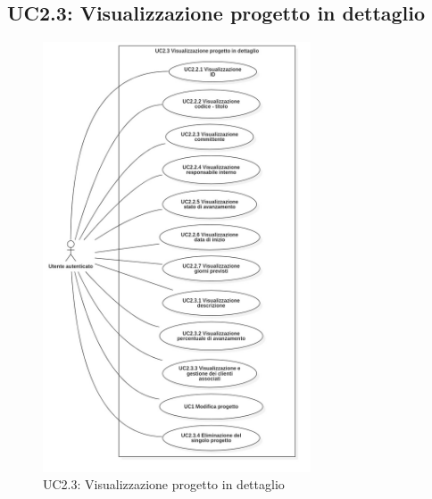 \pagebreak

\subsection{UC2.3: Visualizzazione progetto in dettaglio}
\begin{figure}[!h]
\centering
\includegraphics[width=300px]{../images/UC/.jpeg/UC2.3-visualizzazioneDettaglioProgetto.jpg}
\caption{UC2.3: Visualizzazione progetto in dettaglio}
\label{fig:UC2.3}
\end{figure}

